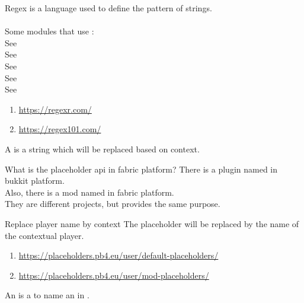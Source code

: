 \clearpage
{}\label{term:regex}

Regex is a language used to define the pattern of strings.\\\\
Some modules that use :\\
See~\\
See~\\
See~\\
See~\\
See~\\

\begin{enumerate}
    \item \url{https://regexr.com/}
    \item \url{https://regex101.com/}
\end{enumerate}


\clearpage
{}

A  is a string which will be replaced based on context.

\begin{tips}{What is the placeholder api in fabric platform?}
    There is a plugin named  in bukkit platform.\\
    Also, there is a mod named  in fabric platform.\\
    They are different projects, but provides the same purpose.
\end{tips}

\begin{example}{Replace player name by context}
    The placeholder  will be replaced by the name of the contextual player.
\end{example}

\begin{enumerate}
    \item \url{https://placeholders.pb4.eu/user/default-placeholders/}
    \item \url{https://placeholders.pb4.eu/user/mod-placeholders/}
\end{enumerate}


\clearpage
{}

An  is a  to name an  in .

